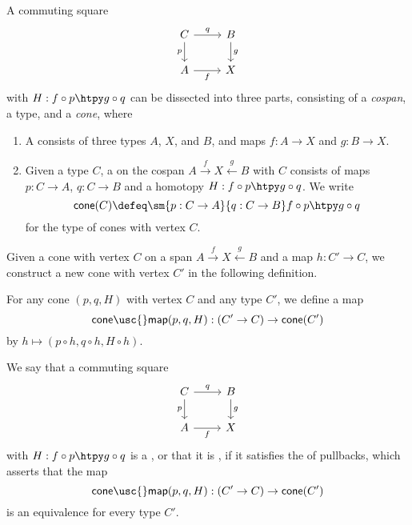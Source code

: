 \begin{defn}\label{defn:cospan}
A commuting square
\begin{equation*}
\begin{tikzcd}
C \arrow[r,"q"] \arrow[d,swap,"p"] & B \arrow[d,"g"] \\
A \arrow[r,swap,"f"] & X
\end{tikzcd}
\end{equation*}
with $H:f\circ p\htpy g\circ q$ can be dissected into three parts, consisting of a \emph{cospan}, a type, and a \emph{cone}, where
\begin{enumerate}
\item A  consists of three types $A$, $X$, and $B$, and maps $f:A\to X$ and $g:B\to X$.
\item Given a type $C$, a  on the cospan $A \stackrel{f}{\rightarrow} X \stackrel{g}{\leftarrow} B$ with  $C$ consists of maps $p:C\to A$, $q:C\to B$ and a homotopy $H:f\circ p\htpy g\circ q$. We write
\begin{equation*}
\mathsf{cone}(C)\defeq \sm{p:C\to A}{q:C\to B}f\circ p\htpy g\circ q
\end{equation*}
for the type of cones with vertex $C$.
\end{enumerate}
\end{defn}

Given a cone with vertex $C$ on a span $A\stackrel{f}{\rightarrow} X \stackrel{g}{\leftarrow} B$ and a map $h:C'\to C$, we construct a new cone with vertex $C'$ in the following definition.

\begin{defn}
For any cone $(p,q,H)$ with vertex $C$ and any type $C'$, we define a map
\begin{equation*}
\mathsf{cone\usc{}map}(p,q,H):(C'\to C)\to\mathsf{cone}(C')
\end{equation*}
by $h\mapsto (p\circ h,q\circ h,H\circ h)$. 
\end{defn}

\begin{defn}
We say that a commuting square
\begin{equation*}
\begin{tikzcd}
C \arrow[r,"q"] \arrow[d,swap,"p"] & B \arrow[d,"g"] \\
A \arrow[r,swap,"f"] & X
\end{tikzcd}
\end{equation*}
with $H:f\circ p\htpy g\circ q$ is a , or that it is , if it satisfies the  of pullbacks, which asserts that the map
\begin{equation*}
\mathsf{cone\usc{}map}(p,q,H):(C'\to C)\to\mathsf{cone}(C')
\end{equation*}
is an equivalence for every type $C'$. 
\end{defn}

